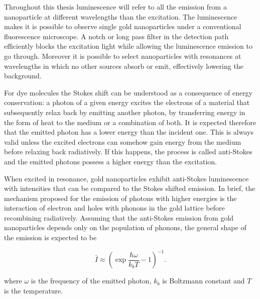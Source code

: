Throughout this thesis luminescence will refer to all the emission from a
nanoparticle at different wavelengths than the excitation. The luminescence
makes it is possible to observe single gold nanoparticles under a conventional
fluorescence microscope. A notch or long pass filter in the detection path
efficiently blocks the excitation light while allowing the luminescence emission
to go through. Moreover it is possible to select nanoparticles with resonances
at wavelengths in which no other sources absorb or emit, effectively lowering
the background.


For dye molecules the Stokes shift can be understood as a consequence of energy
conservation: a photon of a given energy excites the electrons of a material
that subsequently relax back by emitting another photon, by transferring energy
in the form of heat to the medium or a combination of both. It is expected
therefore that the emitted photon has a lower energy than the incident one. This
is always valid unless the excited electrons can somehow gain energy from the
medium before relaxing back radiatively. If this happens, the process is called
anti-Stokes and the emitted photons possess a higher energy than the excitation.

When excited in resonance, gold nanoparticles exhibit anti-Stokes luminescence
with intensities that can be compared to the Stokes shifted emission. In brief, 
the mechanism proposed for the emission of photons with higher energies is the
interaction of electron and holes with phonons in the gold lattice before
recombining radiatively. Assuming that the anti-Stokes emission from gold
nanoparticles depends only on the population of phonons, the general shape of
the emission is expected to be

\begin{equation}\label{eqn:antiStokes}
	\bar{I}\approx\left(\exp\frac{\hbar\omega}{k_bT}-1\right)^{-1}.
\end{equation}

\noindent where $\omega$ is the frequency of the emitted photon, $k_b$ is
Boltzmann constant and $T$ is the temperature. 

